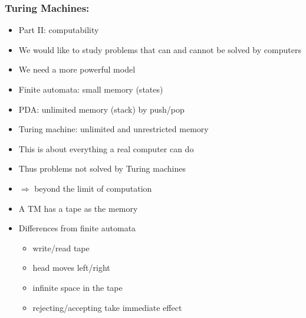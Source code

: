 




\begin{frame}[allowframebreaks]
\frametitle{Turing Machines:}
  \begin{itemize}
\item Part II: computability 
\item [] We would like to study
  problems that can  and cannot be solved by computers
\item We need a more powerful model

\item [] Finite automata: small memory (states)

\item [] PDA: unlimited memory (stack) by push/pop
\item Turing machine: unlimited and unrestricted memory

\item This is about everything a real computer can do

\item Thus problems not solved by Turing machines

\item [] $\Rightarrow$ beyond the limit of computation
\item A TM has a tape as the memory

\begin{center}
\end{center}


\item Differences from finite automata
  \begin{itemize}
  \item write/read tape
  \item head moves left/right
  \item infinite space in the tape
  \item rejecting/accepting take immediate effect


\end{itemize}
\end{itemize}
\end{frame}
